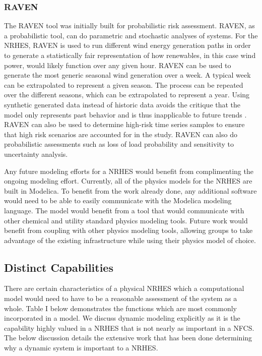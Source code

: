 \documentclass[12pt]{UIdahoMastersThesis}
\begin{document}
\subsubsection{RAVEN}
The RAVEN tool was initially built for probabilistic risk assessment. RAVEN, as a probabilistic tool, can do parametric and stochastic analyses of systems\cite{RabitiRAVEN}. For the NRHES, RAVEN is used to run different wind energy generation paths in order to generate a statistically fair representation of how renewables, in this case wind power, would likely function over any given hour. RAVEN can be used to generate the most generic seasonal wind generation over a week. A typical week can be extrapolated to represent a given season. The process can be repeated over the different seasons, which can be extrapolated to represent a year. Using synthetic generated data instead of historic data avoids the critique that the model only represents past behavior and is thus inapplicable to future trends \cite{redfoot_epiney_2016}. RAVEN can also be used to determine high-risk time series samples to ensure that high risk scenarios are accounted for in the study. RAVEN can also do probabilistic assessments such as loss of load probability and sensitivity to uncertainty analysis.

Any future modeling efforts for a NRHES would benefit from complimenting the ongoing modeling effort. Currently, all of the physics models for the NRHES are built in Modelica. To benefit from the work already done, any additional software would need to be able to easily communicate with the Modelica modeling language.  The model would benefit from a tool that would communicate with other chemical and utility standard physics modeling tools. Future work would benefit from coupling with other physics modeling tools, allowing groups to take advantage of the existing infrastructure while using their physics model of choice.

\subsection{Distinct Capabilities}
There are certain characteristics of a physical NRHES which a computational model would need to have to be a reasonable assessment of the system as a whole. Table I below demonstrates the functions which are most commonly incorporated in a model. We discuss dynamic modeling explicitly as it is the capability highly valued in a NRHES that is not nearly as important in a NFCS. The below discussion details the extensive work that has been done determining why a dynamic system is important to a NRHES.
\end{document}
